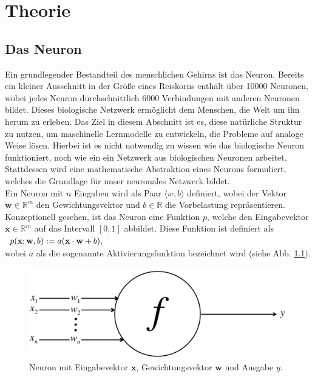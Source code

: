 \chapter{Theorie}
\section{Das Neuron}
Ein grundlegender Bestandteil des menschlichen Gehirns ist das Neuron. Bereits ein kleiner Ausschnitt in der Größe eines Reiskorns enthält über 10000 Neuronen, wobei jedes Neuron durchschnittlich 6000 Verbindungen mit anderen Neuronen bildet. Dieses biologische Netzwerk ermöglicht dem Menschen, die Welt um ihn herum zu erleben. Das Ziel in diesem Abschnitt ist es, diese natürliche Struktur zu nutzen, um maschinelle Lernmodelle zu entwickeln, die Probleme auf analoge Weise lösen. Hierbei ist es nicht notwendig zu wissen wie das biologische Neuron funktioniert, noch wie ein ein Netzwerk aus biologischen Neuronen arbeitet. Stattdessen wird eine mathematische Abstraktion eines Neurons formuliert, welches die Grundlage für unser neuronales Netzwerk bildet. \\
Ein Neuron mit $n$ Eingaben wird als Paar $\langle w,b \rangle$ definiert, wobei der Vektor $\mathbf{w} \in \mathbb{R}^m$ den Gewichtungsvektor und $b \in \mathbb{R}$ die Vorbelastung repräsentieren. Konzeptionell gesehen, ist das Neuron eine Funktion $p$, welche den Eingabevektor $\mathbf{x} \in \mathbb{R}^m$ auf das Intervall $[0,1]$ abbildet. Diese Funktion ist definiert als \\[0.2cm]
\hspace*{1.3cm}
$
\begin{array}[t]{lclll}
	p(\mathbf{x};\mathbf{w},b) := a(\mathbf{x}\cdot\mathbf{w}+b),
\end{array}
$
\\[0.2cm]
wobei $a$ als die sogenannte Aktivierungsfunktion bezeichnet wird (siehe Abb. \ref{fig:perceptron}).
\begin{figure}[hbt]
	\centering
	\includegraphics[scale=0.25]{Bilder/sigmoid_neuron}
	\caption{Neuron mit Eingabevektor $\mathbf{x}$, Gewichtungsvektor $\mathbf{w}$ und Ausgabe $y$.} 
	\label{fig:perceptron} 
\end{figure}

